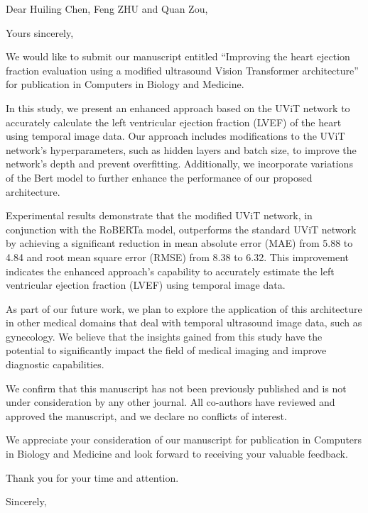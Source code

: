 \documentclass[11pt,a4paper,roman]{moderncv}        %
\title{}
\begin{document}

\date{\today}
\opening{Dear Huiling Chen, Feng ZHU and Quan Zou,}

\closing{Yours sincerely,}
\makelettertitle

\justify

We would like to submit our manuscript entitled ``Improving the heart ejection fraction evaluation using a modified
ultrasound Vision Transformer architecture'' for publication in Computers in Biology and Medicine.

In this study, we present an enhanced approach based on the UViT network to accurately calculate the left ventricular ejection fraction (LVEF) of the heart using temporal image data. Our approach includes modifications to the UViT network's hyperparameters, such as hidden layers and batch size, to improve the network's depth and prevent overfitting. Additionally, we incorporate variations of the Bert model to further enhance the performance of our proposed architecture.

Experimental results demonstrate that the modified UViT network, in conjunction with the RoBERTa model, outperforms the standard UViT network by achieving a significant reduction in mean absolute error (MAE) from 5.88 to 4.84 and root mean square error (RMSE) from 8.38 to 6.32. This improvement indicates the enhanced approach's capability to accurately estimate the left ventricular ejection fraction (LVEF) using temporal image data.

As part of our future work, we plan to explore the application of this architecture in other medical domains that deal with temporal ultrasound image data, such as gynecology. We believe that the insights gained from this study have the potential to significantly impact the field of medical imaging and improve diagnostic capabilities.

We confirm that this manuscript has not been previously published and is not under consideration by any other journal. All co-authors have reviewed and approved the manuscript, and we declare no conflicts of interest.

We appreciate your consideration of our manuscript for publication in Computers in Biology and Medicine and look forward to receiving your valuable feedback.

Thank you for your time and attention.

Sincerely,

\makeletterclosing
\end{document}
